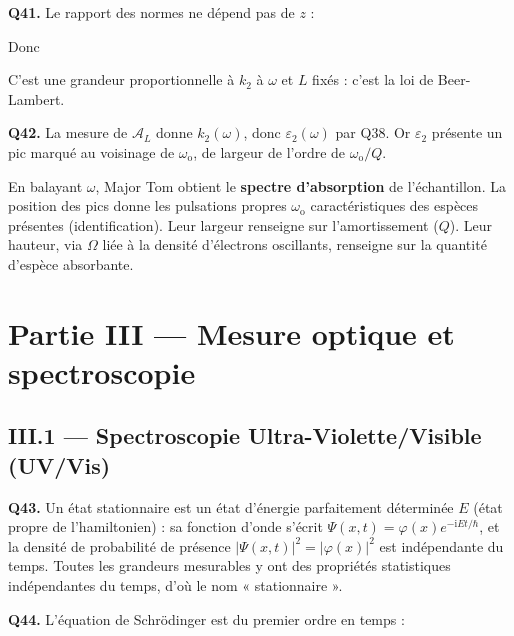 \documentclass[11pt,a4paper]{article}
\newcommand{\equationajustee}[1]{%
  \sbox{\boiteequation}{$\displaystyle #1$}%
  \ifdim\wd\boiteequation>\linewidth
    \[\resizebox{\linewidth}{!}{\usebox{\boiteequation}}\]%
  \else
    \[#1\]%
  \fi}
\begin{document}
\textbf{Q41.} Le rapport des normes ne dépend pas de \(z\) :

\equationajustee{\frac{\|\langle\vec\Pi\rangle(z+L)\|}{\|\langle\vec\Pi\rangle(z)\|}=e^{-2k_2L}}

Donc

\equationajustee{\boxed{\mathcal A_L=-\log_{10}\left(e^{-2k_2L}\right)=\frac{2L}{\ln10}\,k_2(\omega)}}

C'est une grandeur proportionnelle à \(k_2\) à \(\omega\) et \(L\) fixés : c'est la loi de Beer-Lambert.

\textbf{Q42.} La mesure de \(\mathcal A_L\) donne \(k_2(\omega)\), donc \(\varepsilon_2(\omega)\) par Q38. Or \(\varepsilon_2\) présente un pic marqué au voisinage de \(\omega_{\mathrm{o}}\), de largeur de l'ordre de \(\omega_{\mathrm{o}}/Q\).

En balayant \(\omega\), Major Tom obtient le \textbf{spectre d'absorption} de l'échantillon. La position des pics donne les pulsations propres \(\omega_{\mathrm{o}}\) caractéristiques des espèces présentes (identification). Leur largeur renseigne sur l'amortissement (\(Q\)). Leur hauteur, via \(\Omega\) liée à la densité d'électrons oscillants, renseigne sur la quantité d'espèce absorbante.

\hypertarget{partie-iii-mesure-optique-et-spectroscopie}{%
\section{Partie III --- Mesure optique et spectroscopie}\label{partie-iii-mesure-optique-et-spectroscopie}}

\hypertarget{iii.1-spectroscopie-ultra-violettevisible-uvvis}{%
\subsection{III.1 --- Spectroscopie Ultra-Violette/Visible (UV/Vis)}\label{iii.1-spectroscopie-ultra-violettevisible-uvvis}}

\textbf{Q43.} Un état stationnaire est un état d'énergie parfaitement déterminée \(E\) (état propre de l'hamiltonien) : sa fonction d'onde s'écrit \(\Psi(x,t)=\varphi(x)e^{-\mathrm{i}Et/\hbar}\), et la densité de probabilité de présence \(|\Psi(x,t)|^2=|\varphi(x)|^2\) est indépendante du temps. Toutes les grandeurs mesurables y ont des propriétés statistiques indépendantes du temps, d'où le nom « stationnaire ».

\textbf{Q44.} L'équation de Schrödinger est du premier ordre en temps :
\end{document}

